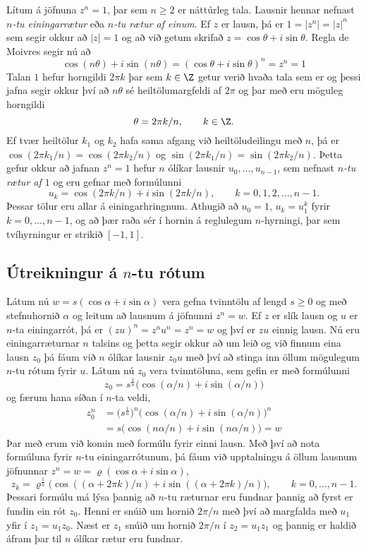 Lítum á jöfnuna $z^n=1$, þar sem $n\geq 2$ er náttúrleg tala.
Lausnir hennar nefnast {\it $n$-tu einingarrætur} eða {\it $n$-tu
rætur af einum}. 
Ef $z$ er lausn, þá er $1=|z^n|=|z|^n$ sem segir okkur
að $|z|=1$ og að við getum skrifað $z=\cos \theta+i\sin \theta$.
Regla de Moivres segir nú að 
$$
\cos (n\theta)+i\sin(n\theta)=(\cos \theta+i\sin \theta)^n=z^n=1
$$
Talan $1$ hefur horngildi $2\pi k$ þar sem  $k\in \Z$ getur verið
hvaða tala sem er 
og þessi jafna segir okkur því að 
$n\theta$ sé heiltölumargfeldi af $2\pi$ og þar með eru möguleg
horngildi
$$
\theta=2\pi k/n, \qquad k\in \Z.
$$
Ef tvær heiltölur $k_1$ og $k_2$ hafa sama afgang við heiltöludeilingu
með $n$, þá er $\cos(2\pi k_1/n)=\cos(2\pi k_2/n)$
og $\sin(2\pi k_1/n)=\sin(2\pi k_2/n)$.  Þetta gefur okkur að 
jafnan $z^n=1$ hefur $n$ ólíkar lausnir $u_0,\dots,u_{n-1}$, 
sem nefnast {\it $n$-tu rætur af $1$} og eru gefnar með formúlunni
$$
u_k=\cos(2\pi k/n)+i\sin(2\pi k/n), \qquad k=0,1,2,\dots,n-1.
$$
Þessar tölur eru allar á einingarhringnum.  Athugið 
að $u_0=1$,  $u_k=u_1^k$ fyrir $k=0,\dots,n-1$,  og að 
þær raða sér í hornin á reglulegum $n$-hyrningi, þar sem tvíhyrningur 
er strikið $[-1,1]$.
\begin{center}
\end{center}


\subsection*{Útreikningur á $n$-tu rótum}

Látum nú $w=s(\cos\alpha+i\sin \alpha)$ vera gefna tvinntölu
af lengd $s\geq 0$ og með stefnuhornið $\alpha$
og leitum að lausnum á jöfnunni $z^n=w$.  Ef $z$ er slík lausn
og $u$ er $n$-ta einingarrót, þá er $(zu)^n=z^nu^n=z^n=w$ og því er 
$zu$ einnig lausn.  Nú eru einingarræturnar $n$ talsins og þetta segir
okkur að um leið og við finnum eina lausn $z_0$ þá fáum við $n$ ólíkar
lausnir $z_0u$ með því að stinga inn öllum mögulegum $n$-tu rótum
fyrir $u$.  
Látum nú $z_0$ vera tvinntöluna, sem gefin er með formúlunni
$$
z_0=s^{\frac 1n}\big(\cos(\alpha/n)+i\sin(\alpha/n)\big)
$$ 
og færum hana síðan í $n$-ta veldi,
\begin{align*}
z_0^n &=\big(s^{\frac 1n}\big)^n\big(\cos(\alpha/n)+i\sin(\alpha/n)\big)^n \\
 & =s\big(\cos(n\alpha/n)+i\sin(n\alpha/n)\big)=w
\end{align*}
Þar með erum við komin með formúlu fyrir einni  lausn. 
Með því að nota formúluna fyrir $n$-tu einingarrótunum, þá
fáum við upptalningu á öllum lausnum jöfnunnar
$z^n=w=\varrho(\cos\alpha+i\sin \alpha)$,
$$
z_k=\varrho^{\frac 1n}\big(\cos((\alpha+2\pi k)/n)+i\sin((\alpha+2\pi
k)/n)\big), \qquad k=0,\dots,n-1.
$$
Þessari formúlu má lýsa þannig að $n$-tu ræturnar eru fundnar þannig að
fyrst er fundin ein rót $z_0$.  Henni er snúið um hornið $2\pi/n$ 
með því að  margfalda með 
$u_1$ yfir í $z_1=u_1z_0$.  Næst er $z_1$ snúið um hornið $2\pi/n$
í $z_2=u_1z_1$ og þannig er haldið áfram þar til $n$ ólíkar rætur eru
fundnar.


